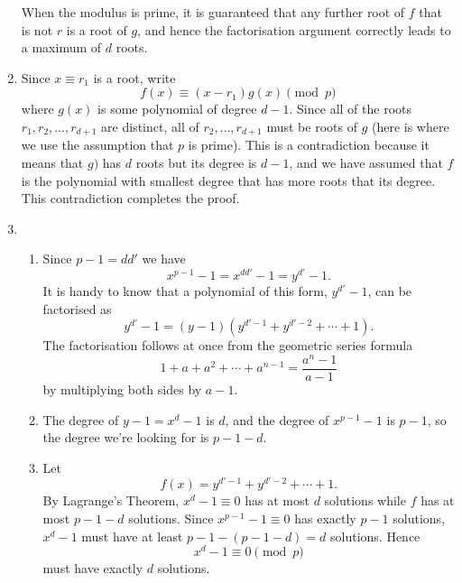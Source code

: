 \documentclass[a4paper]{article}
\begin{document}
\begin{enumerate}
  When the modulus is prime, it is guaranteed that any further root
  of \(f\) that is not \(r\) is a root of \(g\), and hence the factorisation
  argument correctly leads to a maximum of \(d\) roots.
\item Since \(x\equiv r_1\) is a root, write \[f(x)\equiv (x-r_1)g(x)\pmod{p}\]
  where \(g(x)\) is some polynomial of degree \(d-1\). Since all of the roots
  \(r_1,r_2,\ldots,r_{d+1}\) are distinct, all of \(r_2,\ldots,r_{d+1}\) must
  be roots of \(g\) (here is where we use the assumption that \(p\) is prime).
  This is a contradiction because it means that \(g)\) has \(d\) roots but its
  degree is \(d-1\), and we have assumed that \(f\) is the polynomial with smallest
  degree that has more roots that its degree. This contradiction completes the proof.
\item
  \begin{enumerate}
  \item Since \(p-1=dd'\) we have \[x^{p-1}-1=x^{dd'}-1=y^{d'}-1.\] It
    is handy to know that a polynomial of this form, \(y^{d'}-1\),
    can be factorised as \[y^{d'}-1=(y-1)(y^{d'-1}+y^{d'-2}+\cdots+1).\]
    The factorisation follows at once from the geometric series formula
    \[1+a+a^2+\cdots+a^{n-1}=\frac{a^n-1}{a-1}\] by multiplying both sides
    by \(a-1\).
  \item The degree of \(y-1=x^d-1\) is \(d\), and the degree of \(x^{p-1}-1\)
    is \(p-1\), so the degree we're looking for is \(p-1-d\).
  \item Let
    \[f(x)=y^{d'-1}+y^{d'-2}+\cdots+1.\]
    By Lagrange's Theorem, \(x^d-1\equiv0\) has at most \(d\) solutions
    while \(f\) has at most \(p-1-d\) solutions.
    Since \(x^{p-1}-1\equiv0\) has exactly \(p-1\) solutions, \(x^d-1\)
    must have at least \(p-1-(p-1-d)=d\) solutions. Hence \[x^d-1\equiv0\pmod{p}\] must have exactly \(d\) solutions.
    
  \end{enumerate}
\end{enumerate}
\end{document}
